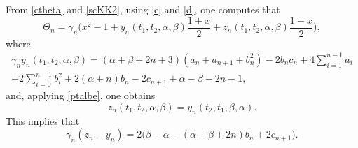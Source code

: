 \documentclass[10pt, reqno]{amsart}
\numberwithin{equation}{section}
\numberwithin{equation}{section}
\begin{document}
From \eqref{ctheta} and \eqref{scKK2}, using \eqref{c} and \eqref{d}, one computes that
\begin{equation}
\Theta_n=\gamma_n\Big(x^2-1+y_n(t_1,t_2,\alpha,\beta)\frac{1+x}{2}+z_n(t_1,t_2,\alpha,\beta)\frac{1-x}{2}\Big), \label{Ktheta}
\end{equation}
where
\begin{multline}
\gamma_ny_n(t_1,t_2,\alpha,\beta)=(\alpha+\beta+2n+3)(a_n+a_{n+1}+b_n^2)-2b_nc_n+4\sum_{i=1}^{n-1}a_i\\
+2\sum_{i=0}^{n-1}b_i^2+2(\alpha+n)b_n-2c_{n+1}+\alpha-\beta-2n-1, \label{Kyab}
\end{multline}
and, applying \eqref{ptalbe}, one obtains
\begin{equation}
z_n(t_1,t_2,\alpha,\beta)=y_n(t_2,t_1,\beta,\alpha).\label{zy}
\end{equation}
This implies that 
\begin{equation}
\gamma_n(z_n-y_n)=2\big(\beta-\alpha-(\alpha+\beta+2n)b_n+2c_{n+1}\big).\label{Kzmy}
\end{equation}
\end{document}

